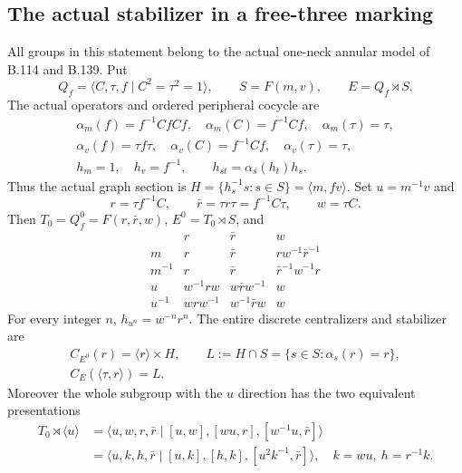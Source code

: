 \subsection*{The actual stabilizer in a free-three marking}
\label{stmt:B148}
All groups in this statement belong to the actual one-neck annular model
of B.114 and B.139. Put
\[
 Q_f=\langle C,\tau,f\mid C^2=\tau^2=1\rangle,
 \qquad S=F(m,v),\qquad E=Q_f\rtimes S.
\]
The actual operators and ordered peripheral cocycle are
\begin{equation}\label{eq:B148-input}
\begin{gathered}
 \alpha_m(f)=f^{-1}CfCf,\quad \alpha_m(C)=f^{-1}Cf,
 \quad\alpha_m(\tau)=\tau,\\
 \alpha_v(f)=\tau f\tau,\quad \alpha_v(C)=f^{-1}Cf,
 \quad\alpha_v(\tau)=\tau,\\
 h_m=1,\quad h_v=f^{-1},\qquad
 h_{st}=\alpha_s(h_t)h_s.
\end{gathered}
\end{equation}
Thus the actual graph section is
$H=\{h_s^{-1}s:s\in S\}=\langle m,fv\rangle$.
Set $u=m^{-1}v$ and
\[
 r=\tau f^{-1}C,\qquad \bar r=\tau r\tau=f^{-1}C\tau,
 \qquad w=\tau C.
\]
Then $T_0=Q_f^0=F(r,\bar r,w)$, $E^0=T_0\rtimes S$, and
\begin{equation}\label{eq:B148-actions}
\begin{array}{c|ccc}
 &r&\bar r&w\\\hline
 m&r&\bar r&rw^{-1}\bar r^{-1}\\
 m^{-1}&r&\bar r&\bar r^{-1}w^{-1}r\\
 u&w^{-1}rw&w\bar r w^{-1}&w\\
 u^{-1}&wrw^{-1}&w^{-1}\bar r w&w
\end{array}
\end{equation}
For every integer $n$, $h_{u^n}=w^{-n}r^n$. The entire discrete
centralizers and stabilizer are
\begin{equation}\label{eq:B148-centralizers}
\begin{gathered}
 C_{E^0}(r)=\langle r\rangle\times H,\qquad
 L:=H\cap S=\{s\in S:\alpha_s(r)=r\},\\
 C_E(\langle\tau,r\rangle)=L.
\end{gathered}
\end{equation}
Moreover the whole subgroup with the $u$ direction has the two equivalent
presentations
\begin{equation}\label{eq:B148-vertex}
\begin{aligned}
 T_0\rtimes\langle u\rangle
 &=\langle u,w,r,\bar r\mid[u,w],[wu,r],[w^{-1}u,\bar r]\rangle\\
 &=\langle u,k,h,\bar r\mid[u,k],[h,k],[u^2k^{-1},\bar r]\rangle,
 \quad k=wu,\ h=r^{-1}k.
\end{aligned}
\end{equation}
